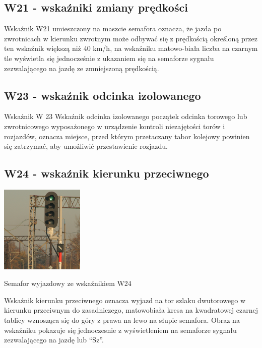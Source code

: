 \subsection{W21 - wskaźniki zmiany prędkości}

Wskaźnik W21 umieszczony na maszcie semafora oznacza, że jazda po zwrotnicach w kierunku zwrotnym może odbywać się z prędkością określoną przez ten  wskaźnik większą niż 40 km/h, na wskaźniku matowo-biała liczba na czarnym tle wyświetla się jednocześnie z ukazaniem się na semaforze sygnału zezwalającego na jazdę ze zmniejszoną prędkością.

\subsection{W23 - wskaźnik odcinka izolowanego}

Wskaźnik W 23 {\textquotedbl}Wskaźnik odcinka izolowanego{\textquotedbl} początek odcinka torowego lub zwrotnicowego
wyposażonego w urządzenie kontroli niezajętości torów i rozjazdów, oznacza miejsce, przed którym przetaczany tabor
kolejowy powinien się zatrzymać, aby umożliwić przestawienie rozjazdu.

\subsection{W24 - wskaźnik kierunku przeciwnego}

	\begin{marginfigure}
	\includegraphics[width=4cm]{skryptkierownik-img/skryptkierownik-img018.jpg}
	\caption{Semafor wyjazdowy ze wskaźnikiem W24}
\end{marginfigure}
\begin{tcolorbox}[colback=black!5!white,colframe=white!55!black,title=Wskaźnik W24]
{\textquotedbl}Wskaźnik kierunku przeciwnego{\textquotedbl} oznacza wyjazd na tor szlaku dwutorowego w kierunku przeciwnym do zasadniczego, matowobiała kresa na kwadratowej czarnej tablicy wznosząca się do góry z prawa na lewo na słupie semafora. Obraz na wskaźniku pokazuje się jednoczesnie z wyświetleniem na semaforze sygnału zezwalającego na jazdę lub “Sz”.
\end{tcolorbox} 


